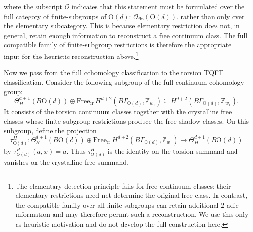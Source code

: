 \documentclass[aps,prx,reprint,superscriptaddress,twocolumn,amsmath,amssymb,amsfonts, nofootinbib]{revtex4-2}
\newcommand{\ofin}{\mathcal{O}_{\text{fin}}}
\newcommand{\Z}{\mathbb{Z}}
\theoremstyle{apsstyle}
\begin{document}
where the subscript $\mathcal{O}$ indicates that this statement must be formulated over the full category of finite-subgroups of $\mathrm{O}(d)$: $\ofin(\mathrm{O}(d))$, rather than only over the elementary subcategory. This is because elementary restriction does not, in general, retain enough information to reconstruct a free continuum class. The full compatible family of finite-subgroup restrictions is therefore the appropriate input for the heuristic reconstruction above.\footnote{The elementary-detection principle fails for free continuum classes: their elementary restrictions need not determine the original free class. In contrast, the compatible family over all finite subgroups can retain additional $2$-adic information and may therefore permit such a reconstruction. We use this only as heuristic motivation and do not develop the full construction here.}

\bigskip 


Now we pass from the full cohomology classification to the torsion TQFT classification. Consider the following subgroup of the full continuum cohomology group:
\begin{equation*}
\Theta^{d+1}_{H}(B\mathrm{O}(d)) \oplus \mathrm{Free}_{\mathrm{cr}}\,
H^{d+2}(B\Gamma_{\mathrm{O}(d)},\Z_{w_1})
\subseteq H^{d+2}(B\Gamma_{\mathrm{O}(d)},\Z_{w_1}).
\end{equation*}
It consists of the torsion continuum classes together with the crystalline free classes whose finite-subgroup restrictions produce the free-shadow classes. On this subgroup, define the projection
\begin{equation*}
\tau_{\mathrm{O}(d)}^{H}:
\Theta^{d+1}_{H}(B\mathrm{O}(d))
\oplus
\mathrm{Free}_{\mathrm{cr}}\,
H^{d+2}(B\Gamma_{\mathrm{O}(d)},\Z_{w_1})
\longrightarrow
\Theta^{d+1}_{H}(B\mathrm{O}(d))
\end{equation*}
by $ \tau_{\mathrm{O}(d)}^{H}(a,x)=a$. Thus $\tau_{\mathrm{O}(d)}^{H}$ is the identity on the torsion summand and vanishes on the crystalline free summand.

\bigskip 
\end{document}
